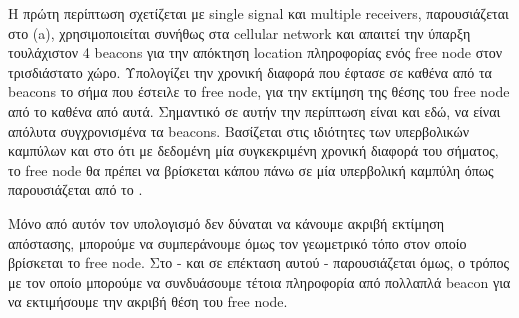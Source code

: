 Η πρώτη περίπτωση σχετίζεται με single signal και multiple receivers, παρουσιάζεται στο 
 (a), 
χρησιμοποιείται συνήθως στα cellular network και απαιτεί την ύπαρξη 
τουλάχιστον 4 beacons για την απόκτηση location πληροφορίας ενός free node στον τρισδιάστατο χώρο. Υπολογίζει την χρονική διαφορά
που έφτασε σε καθένα από τα beacons το σήμα που έστειλε το free node, για την εκτίμηση της θέσης του free node από
το καθένα από αυτά. Σημαντικό σε αυτήν την περίπτωση είναι και εδώ, να είναι απόλυτα συγχρονισμένα τα beacons. 
Βασίζεται στις ιδιότητες των υπερβολικών καμπύλων και στο ότι με δεδομένη μία συγκεκριμένη χρονική διαφορά του σήματος, 
το free node θα πρέπει να βρίσκεται κάπου πάνω σε μία υπερβολική καμπύλη όπως παρουσιάζεται από το 
\cite{youtube-angle-of-arrival-tdoa-hyberbolas}. 

Μόνο από αυτόν τον υπολογισμό δεν δύναται να κάνουμε ακριβή εκτίμηση από\-στασης, 
μπορούμε να συμπεράνουμε όμως τον γεωμετρικό τόπο στον οποίο βρίσκεται το free node. Στο  - και σε επέκταση αυτού -
παρουσιάζεται όμως, ο τρόπος με τον οποίο μπορούμε να συνδυάσουμε τέτοια πληροφορία από πολλαπλά beacon για να εκτιμήσουμε την ακριβή θέση του free node.

